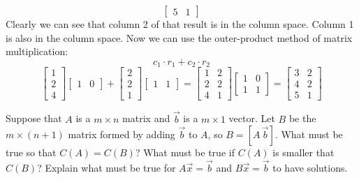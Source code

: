 \documentclass[]{exam}
\begin{document}
\begin{questions}
\begin{solution}
\[\begin{bmatrix}
			5 & 1
		\end{bmatrix}
	\]
	Clearly we can see that column 2 of that result is in the column space.  Column 1 is also in the column space.
	Now we can use the outer-product method of matrix multiplication:
	\[
		c_1\cdot r_1 + c_2\cdot r_2	
	\]
	\[
		\begin{bmatrix}
			1 \\ 2 \\ 4
		\end{bmatrix}
		\begin{bmatrix}
			1 & 0
		\end{bmatrix} +
		\begin{bmatrix}
			2 \\ 2 \\ 1
		\end{bmatrix}
		\begin{bmatrix}
			1 & 1
		\end{bmatrix}
		=
		\begin{bmatrix}
			1 & 2 \\
			2 & 2 \\
			4 & 1
		\end{bmatrix}
		\begin{bmatrix}
			1 & 0 \\
			1 & 1
		\end{bmatrix} = 
		\begin{bmatrix}
			3 & 2 \\
			4 & 2 \\
			5 & 1
		\end{bmatrix}
	\]
\end{solution}
\newpage
\question Suppose that $A$ is a $m \times n$ matrix and $\vec{b}$ is a $m \times 1$ vector. Let $B$ be the $m \times (n+1)$ matrix formed by adding $\vec{b}$ to $A$, so $B = [A \, \vec{b}]$. What must be true so that $C(A)=C(B)$? What must be true if $C(A)$ is smaller that $C(B)$? Explain what must be true for $A \vec{x} = \vec{b}$ and $B \vec{x} = \vec{b}$ to have solutions. 



\end{questions}
\end{document}
